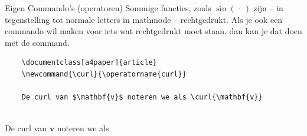 \begin{frame}[fragile]{Eigen Commando's (operatoren)}
Sommige functies, zoals $\sin(\,\cdot\,)$ zijn -- in tegenstelling tot normale letters in 
mathmode -- rechtgedrukt. Als je ook een commando wil maken voor iets wat rechtgedrukt moet 
staan, dan kan je dat doen met de \texttt{\operatorname{}} command. 
\pause
\begin{verbatim}
    \documentclass[a4paper]{article}
    \newcommand{\curl}{\operatorname{curl}}
    
    De curl van $\mathbf{v}$ noteren we als \curl{\mathbf{v}}
    
\end{verbatim}
\pause
\newcommand{\curl}{\operatorname{curl}}
\begin{tcolorbox}[boxrule=0.5pt, colback=white]
    De curl van $\mathbf{v}$ noteren we als \curl{\mathbf{v}}
\end{tcolorbox}
\end{frame}